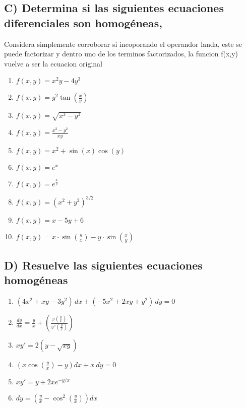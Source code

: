 \documentclass[a4paper,12pt]{article}
\begin{document}
\subsection*{C) Determina si las siguientes ecuaciones diferenciales son homogéneas, }
Considera simplemente corroborar si incoporando el operandor landa, este se puede factorizar y dentro uno de los terminos factorizados, la funcion f(x,y) vuelve a ser la ecuacion original
\begin{enumerate}
    \item $f(x,y)=x^{2} y-4y^{3}$
    \item $f(x,y)=y^{2}\tan\left(\frac{x}{y}\right)$
    \item $f(x,y)=\sqrt{x^{3} -y^{3}}$
    \item $f(x,y)=\frac{x^{2} -y^{2}}{xy}$
    \item $f(x,y)=x^{2} +\sin (x)\cos (y)$
    \item $f(x,y)=e^{x}$
    \item $f(x,y)=e^{\frac{x}{y}}$
    \item $f(x,y)=\left( x^{2} +y^{2}\right)^{3/2}$
    \item $f(x,y)=x-5y+6$
    \item $f(x,y)=x\cdot \sin\left(\frac{y}{x}\right) -y\cdot \sin\left(\frac{x}{y}\right)$
\end{enumerate}

\subsection*{D) Resuelve las siguientes ecuaciones homogéneas}
\begin{enumerate}
    \item $(4x^{2} +xy-3y^{2} )\,dx+(-5x^{2} +2xy+y^{2} )\,dy=0$
    \item $\frac{dy}{dx} =\frac{y}{x} +\left(\frac{\varphi \left(\frac{y}{x}\right)}{\varphi '\left(\frac{y}{x}\right)}\right)$
    \item $xy'=2(y-\sqrt{xy})$
    \item $\left( x\cos\left(\frac{y}{x}\right) -y\right) dx+x\ dy=0$
    \item $xy'=y+2xe^{-y/x}$
    \item $dy =\left(\frac{y}{x} -\cos^{2}\left(\frac{y}{x}\right)\right) dx$
\end{enumerate}
\end{document}
